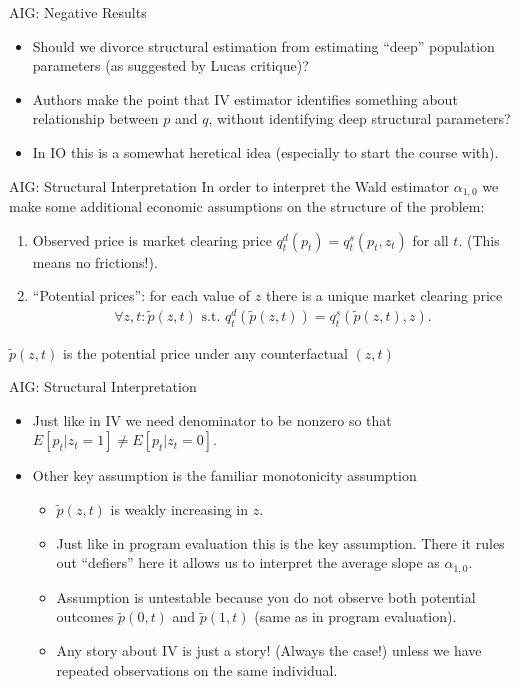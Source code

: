 \documentclass[aspectratio=169,11pt]{beamer}
\begin{document}
\begin{frame}{AIG: Negative Results}
\begin{itemize}
\item Should we divorce structural estimation from estimating ``deep'' population parameters (as suggested by Lucas critique)?
\item Authors make the point that IV estimator identifies something about relationship between $p$ and $q$, without identifying deep structural parameters?
\item In IO this is a somewhat heretical idea (especially to start the course with).
\end{itemize}
\end{frame}

\begin{frame}{AIG: Structural Interpretation}
In order to interpret the Wald estimator $\alpha_{1,0}$ we make some additional \alert{economic} assumptions on the structure of the problem:
\begin{enumerate}
\item Observed price is market clearing price $q_t^d(p_t) = q_t^s(p_t,z_t)$ for all $t$. (This means no frictions!).
\item ``Potential prices'': for each value of $z$ there is a unique market clearing price
\begin{eqnarray*}
\forall z,t : \tilde{p}(z,t) \mbox{ s.t. } q_t^d(\tilde{p}(z,t)) = q_t^s(\tilde{p}(z,t),z).
\end{eqnarray*}
\end{enumerate}
$\tilde{p}(z,t)$ is the potential price under any counterfactual $(z,t)$
\end{frame}


\begin{frame}{AIG: Structural Interpretation}
\begin{itemize}
\item Just like in IV we need denominator to be nonzero so that
$E[p_t | z_t=1] \neq E[p_t | z_t = 0]$.
\item Other key assumption is the familiar \alert{monotonicity} assumption
\begin{itemize}
\item $\tilde{p}(z,t)$ is weakly increasing in $z$.
\item Just like in program evaluation this is the key assumption. There it rules out ``defiers'' here it allows us to interpret the \alert{average slope} as $\alpha_{1,0}$.
\item Assumption is untestable because you do not observe both potential outcomes $\tilde{p}(0,t)$ and $\tilde{p}(1,t)$ (same as in program evaluation).
\item Any story about IV is just a story! (Always the case!) unless we have repeated observations on the same individual.
\end{itemize}
\end{itemize}
\end{frame}
\end{document}
